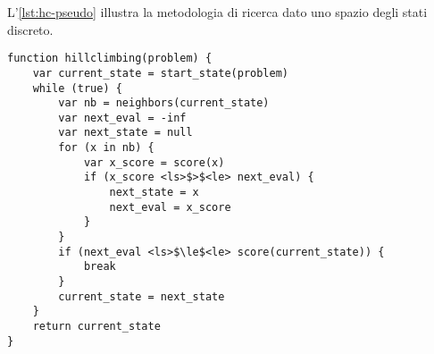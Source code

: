 L'\autoref{lst:hc-pseudo} illustra la metodologia di ricerca \emph{\keyword{\hc{}}} dato uno spazio degli stati discreto.
\vspace*{8pt}\begin{lstlisting}[language=pseudo, label=lst:hc-pseudo, caption={[Algoritmo \emph{\hc{}}]Algoritmo \emph{\hc{}} per uno spazio degli stati discreto.}]
function hillclimbing(problem) {
    var current_state = start_state(problem)
    while (true) {
        var nb = neighbors(current_state)
        var next_eval = -inf
        var next_state = null
        for (x in nb) {
            var x_score = score(x)
            if (x_score <ls>$>$<le> next_eval) {
                next_state = x
                next_eval = x_score
            }
        }
        if (next_eval <ls>$\le$<le> score(current_state)) {
            break
        }
        current_state = next_state
    }
    return current_state
}
\end{lstlisting}







